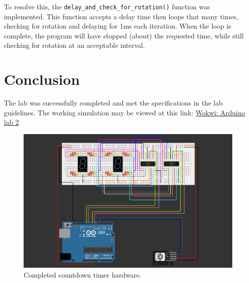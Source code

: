 \documentclass[fleqn]{article}
\begin{document}
\vspace{0.15cm}
To resolve this, the \verb|delay_and_check_for_rotation()| function was implemented. This function accepts a delay time then loops that many times, checking for rotation and delaying for 1ms each iteration. When the loop is complete, the program will have stopped (about) the requested time, while still checking for rotation at an acceptable interval.

\section*{Conclusion}
The lab was successfully completed and met the specifications in the lab guidelines. The working simulation may be viewed at this link: \href{https://wokwi.com/projects/416744232255463425}{Wokwi: Arduino lab 2}
    \begin{figure}[H]
        \centering
        \includegraphics[width=5in]{circut.png}
        \caption{Completed countdown timer hardware.}
    \end{figure}
\end{document}
